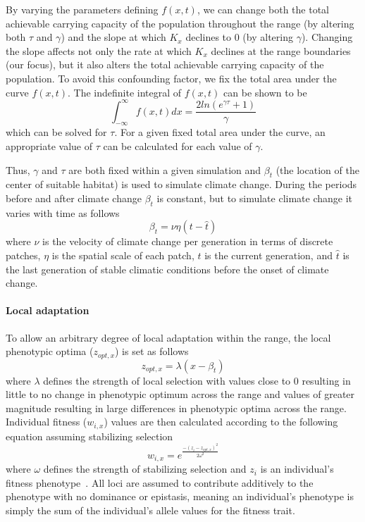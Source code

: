 \documentclass[11pt, oneside]{article}
\begin{document}
By varying the parameters defining $f(x,t)$, we can change both the total achievable carrying capacity of the population throughout the range (by altering both $\tau$ and $\gamma$) and the slope at which $K_{x}$ declines to $0$ (by altering $\gamma$). Changing the slope affects not only the rate at which $K_{x}$ declines at the range boundaries (our focus), but it also alters the total achievable carrying capacity of the population. To avoid this confounding factor, we fix the total area under the curve $f(x,t)$. The indefinite integral of $f(x,t)$ can be shown to be
\begin{equation}
\int_{-\infty}^{\infty}f(x,t)dx = \frac{2ln(e^{\gamma\tau}+1)}{\gamma}
\end{equation}
which can be solved for $\tau$. For a given fixed total area under the curve, an appropriate value of $\tau$ can be calculated for each value of $\gamma$.

Thus, $\gamma$ and $\tau$ are both fixed within a given simulation and $\beta_{t}$ (the location of the center of suitable habitat) is used to simulate climate change. During the periods before and after climate change $\beta_{t}$ is constant, but to simulate climate change it varies with time as follows
\begin{equation}
\beta_{t}=\nu\eta(t-\hat{t})
\end{equation}
where $\nu$ is the velocity of climate change per generation in terms of discrete patches, $\eta$ is the spatial scale of each patch, $t$ is the current generation, and $\hat{t}$ is the last generation of stable climatic conditions before the onset of climate change.

\paragraph{Local adaptation}
To allow an arbitrary degree of local adaptation within the range, the local phenotypic optima ($z_{opt,x}$) is set as follows
\begin{equation}
z_{opt,x}=\lambda(x-\beta_{t})
\end{equation}
where $\lambda$ defines the strength of local selection with values close to $0$ resulting in little to no change in phenotypic optimum across the range and values of greater magnitude resulting in large differences in phenotypic optima across the range. Individual fitness ($w_{i,x}$) values are then calculated according to the following equation assuming stabilizing selection
\begin{equation}
w_{i,x}=e^{\frac{-(z_{i}-z_{opt,x})^{2}}{2\omega^{2}}}
\end{equation}
where $\omega$ defines the strength of stabilizing selection and $z_{i}$ is an individual's fitness phenotype~\citep{lande1976natural}. All loci are assumed to contribute additively to the phenotype with no dominance or epistasis, meaning an individual's phenotype is simply the sum of the individual's allele values for the fitness trait.
\end{document}
